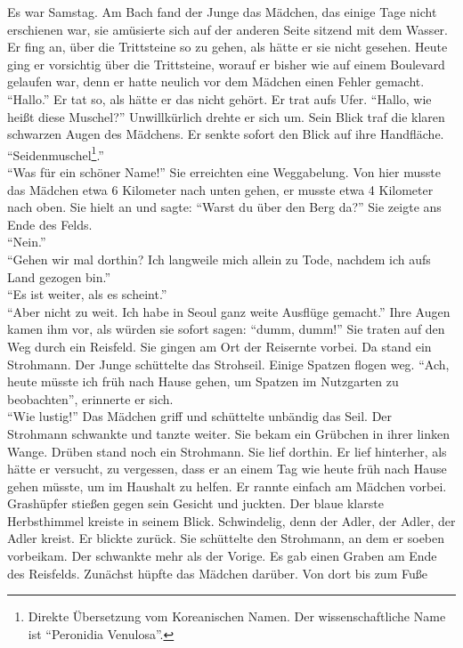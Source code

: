 \documentclass[prd,12pt,tightenlines,notitlepage,nofootinbib]{revtex4-1}
\begin{document}
Es war Samstag.  Am Bach fand der Junge das Mädchen, das einige
Tage nicht erschienen war, sie amüsierte sich auf der anderen Seite sitzend mit dem Wasser.  Er fing an, über die Trittsteine so zu gehen, als hätte er sie
nicht gesehen.  Heute ging er vorsichtig über die Trittsteine, worauf
er bisher wie auf einem Boulevard gelaufen war, denn er hatte neulich vor dem
Mädchen einen Fehler gemacht.  "`Hallo."'  Er tat so, als hätte er das nicht
gehört.  Er trat aufs Ufer.  "`Hallo, wie heißt diese Muschel?"'
Unwillkürlich drehte er sich um.  Sein Blick traf die klaren schwarzen
Augen des Mädchens.  Er senkte sofort den Blick auf ihre Handfläche.
"`Seidenmuschel\footnote{Direkte Übersetzung vom Koreanischen Namen.
  Der wissenschaftliche Name ist "`Peronidia Venulosa"'.}."'\\
"`Was für ein schöner Name!"'  Sie erreichten eine Weggabelung.
Von hier musste das Mädchen etwa 6 Kilometer nach unten gehen, er musste
etwa 4 Kilometer nach oben.  Sie hielt an und sagte: "`Warst du über den
Berg da?"'  Sie zeigte ans Ende des Felds.\\
"`Nein."'\\
"`Gehen wir mal dorthin?
Ich langweile mich allein zu Tode, nachdem ich aufs Land
gezogen bin."'\\
"`Es ist weiter, als es scheint."'\\
"`Aber nicht zu weit.
Ich habe in Seoul ganz weite Ausflüge gemacht."'  Ihre Augen kamen ihm
vor, als würden sie sofort sagen: "`dumm, dumm!"'  Sie traten auf den Weg
durch ein Reisfeld.  Sie gingen am Ort der Reisernte vorbei.
Da stand ein Strohmann.  Der Junge schüttelte das Strohseil.  Einige
Spatzen flogen weg.  "`Ach, heute müsste ich früh nach Hause gehen, um
Spatzen im Nutzgarten zu beobachten"', erinnerte er sich.\\
"`Wie lustig!"'
Das Mädchen griff und schüttelte unbändig das Seil.  Der Strohmann schwankte und
tanzte weiter.  Sie bekam ein Grübchen in ihrer linken Wange.  Drüben
stand noch ein Strohmann.  Sie lief dorthin.  Er lief hinterher,
als hätte er versucht, zu vergessen, dass er an einem Tag wie heute
früh nach Hause gehen müsste, um im Haushalt zu helfen.  Er rannte
einfach am Mädchen vorbei.  Grashüpfer stießen gegen sein
Gesicht und juckten.  Der blaue klarste Herbsthimmel kreiste in seinem Blick.
Schwindelig, denn der Adler, der Adler, der Adler kreist.  Er blickte
zurück.  Sie schüttelte den Strohmann, an dem er soeben vorbeikam.  Der
schwankte mehr als der Vorige.  Es gab einen Graben am Ende des
Reisfelds.  Zunächst hüpfte das Mädchen darüber.  Von dort bis zum Fuße
\end{document}
